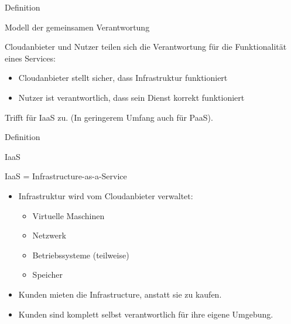 \documentclass{scrartcl}
\newenvironment{flashcard}[2][]{%
    #1
    \vfill
    \centerline{\Large{#2}}
    \vfill
    \newpage
}
{\newpage}
\begin{document}
    \begin{flashcard}[Definition]{Modell der gemeinsamen Verantwortung}
        Cloudanbieter und Nutzer teilen sich die Verantwortung für die Funktionalität eines Services:
        \begin{itemize}
            \item Cloudanbieter stellt sicher, dass Infrastruktur funktioniert
            \item Nutzer ist verantwortlich, dass sein Dienst korrekt funktioniert
        \end{itemize}
        Trifft für IaaS zu. (In geringerem Umfang auch für PaaS).
    \end{flashcard}

    \begin{flashcard}[Definition]{IaaS}
        IaaS = Infrastructure-as-a-Service

        \begin{itemize}
            \item Infrastruktur wird vom Cloudanbieter verwaltet:
            \begin{itemize}
                \item Virtuelle Maschinen
                \item Netzwerk
                \item Betriebssysteme (teilweise)
                \item Speicher
            \end{itemize}
            \item Kunden mieten die Infrastructure, anstatt sie zu kaufen.
            \item Kunden sind komplett selbst verantwortlich für ihre eigene Umgebung.
        \end{itemize}
    \end{flashcard}
\end{document}
